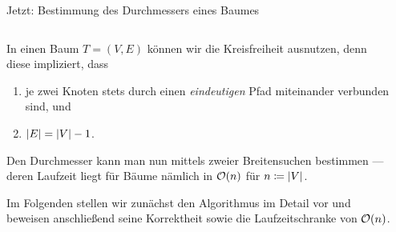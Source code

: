 
\begin{frame}{Jetzt: Bestimmung des Durchmessers eines Baumes}
\begin{columns}[T]
\begin{column}{0.6\textwidth}
In einen Baum $T = (V, E)$ können wir die \alert{Kreisfreiheit} ausnutzen, denn diese impliziert, dass
\begin{enumerate}
    \item je zwei Knoten stets durch einen \emph{eindeutigen} Pfad miteinander verbunden sind, und
    \item $\vert E\vert = \vert V\vert - 1$.
\end{enumerate}

\medskip

Den Durchmesser kann man nun mittels zweier \alert{Breitensuchen} bestimmen --- deren Laufzeit liegt f\"ur B\"aume n\"amlich in $\mathcal{O}(n)$ f\"ur $n \coloneqq \vert V\vert$.

\medskip

Im Folgenden stellen wir zun\"achst den Algorithmus im Detail vor und beweisen anschlie{\ss}end seine Korrektheit sowie die Laufzeitschranke von $\mathcal{O}(n)$.
\end{column}
\begin{column}{0.35\textwidth}
\vspace{0.8cm}
\end{column}
\end{columns}
\end{frame}

